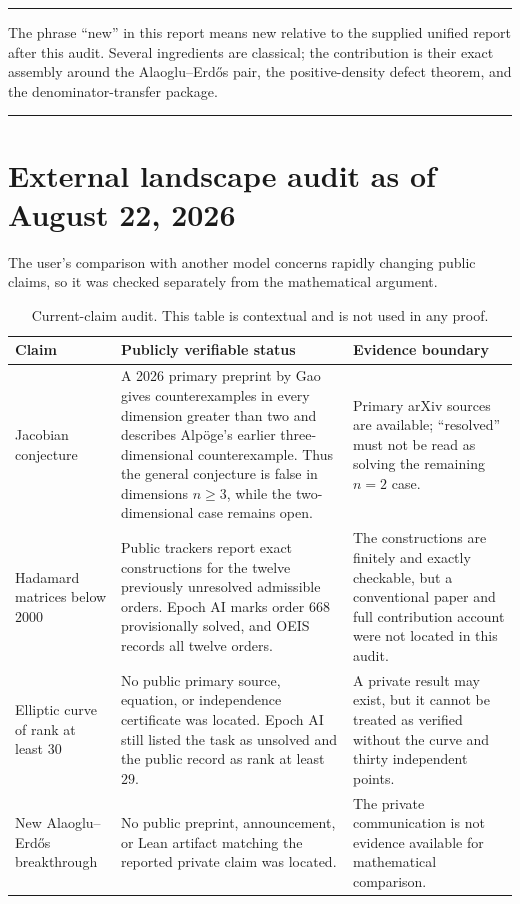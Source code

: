 \documentclass[11pt]{article}
\theoremstyle{definition}
\newcommand{\AEname}{Alaoglu--Erd\H{o}s}
\newenvironment{statusbox}
{\begin{center}\begin{minipage}{0.94\textwidth}\small\hrule\vspace{0.45em}}
{\vspace{0.35em}\hrule\end{minipage}\end{center}}
\begin{document}
\begin{statusbox}
The phrase ``new'' in this report means new relative to the supplied unified report after this
audit.  Several ingredients are classical; the contribution is their exact assembly around
the \AEname{} pair, the positive-density defect theorem, and the denominator-transfer package.
\end{statusbox}

\section{External landscape audit as of August 22, 2026}
\label{sec:landscape}

The user's comparison with another model concerns rapidly changing public claims, so it was
checked separately from the mathematical argument.

\begin{table}[ht]
\centering
\small
\begin{tabularx}{\textwidth}{p{}X p{}}
\toprule
Claim & Publicly verifiable status & Evidence boundary \\
\midrule
Jacobian conjecture & A 2026 primary preprint by Gao gives counterexamples in every dimension
greater than two and describes Alp\"oge's earlier three-dimensional counterexample.  Thus the
general conjecture is false in dimensions $n\ge3$, while the two-dimensional case remains
open. & Primary arXiv sources are available; ``resolved'' must not be read as solving the
remaining $n=2$ case. \\
Hadamard matrices below $2000$ & Public trackers report exact constructions for the twelve
previously unresolved admissible orders.  Epoch AI marks order $668$ provisionally solved, and
OEIS records all twelve orders. & The constructions are finitely and exactly checkable, but a
conventional paper and full contribution account were not located in this audit. \\
Elliptic curve of rank at least $30$ & No public primary source, equation, or independence
certificate was located.  Epoch AI still listed the task as unsolved and the public record as
rank at least $29$. & A private result may exist, but it cannot be treated as verified without
the curve and thirty independent points. \\
New \AEname{} breakthrough & No public preprint, announcement, or Lean artifact matching the
reported private claim was located. & The private communication is not evidence available for
mathematical comparison. \\
\bottomrule
\end{tabularx}
\caption{Current-claim audit.  This table is contextual and is not used in any proof.}
\end{table}
\end{document}
